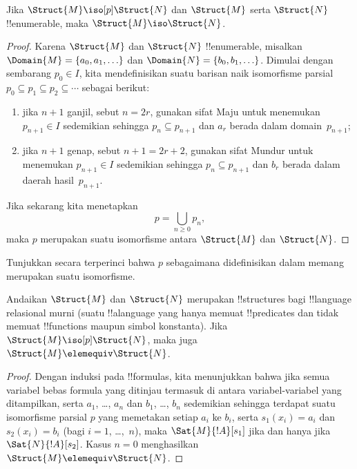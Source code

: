 \documentclass[../../../include/open-logic-section]{subfiles}
\begin{document}
\begin{thm}
  Jika $\Struct{M} \iso[p] \Struct{N}$ dan $\Struct{M}$ serta
  $\Struct{N}$ !!{enumerable}, maka $\Struct{M} \iso \Struct{N}$.
\end{thm}

\begin{proof}
  Karena $\Struct{M}$ dan $\Struct{N}$ !!{enumerable}, misalkan
  $\Domain{M} = \{a_0, a_1, \ldots \}$ dan $\Domain{N} =
  \{b_0, b_1, \ldots \}$. Dimulai dengan sembarang $p_0 \in I$, kita
  mendefinisikan suatu barisan naik isomorfisme parsial $p_0 \subseteq p_1
  \subseteq p_2 \subseteq \cdots$ sebagai berikut:
  \begin{enumerate}
  \item jika $n+1$ ganjil, sebut $n = 2r$, gunakan sifat Maju untuk
    menemukan $p_{n+1} \in I$ sedemikian sehingga $p_n \subseteq p_{n+1}$
    dan $a_r$ berada dalam domain~$p_{n+1}$;
  \item jika $n+1$ genap, sebut $n+1 =2r+2$, gunakan sifat Mundur untuk
    menemukan $p_{n+1} \in I$ sedemikian sehingga $p_n \subseteq p_{n+1}$
    dan $b_r$ berada dalam daerah hasil~$p_{n+1}$.
  \end{enumerate}
Jika sekarang kita menetapkan
\[
p = \bigcup_{n\ge 0} p_n,
\]
maka $p$ merupakan suatu isomorfisme antara $\Struct{M}$ dan $\Struct{N}$.
\end{proof}

\begin{prob}
  Tunjukkan secara terperinci bahwa $p$ sebagaimana didefinisikan dalam
   memang merupakan suatu isomorfisme.
\end{prob}

\begin{thm}
  Andaikan $\Struct{M}$ dan $\Struct{N}$ merupakan !!{structure}s bagi
  !!{language} relasional murni (suatu !!a{language} yang hanya memuat
  !!{predicate}s dan tidak memuat !!{function}s maupun simbol konstanta).
  Jika $\Struct{M} \iso[p] \Struct{N}$, maka juga
  $\Struct{M} \elemequiv \Struct{N}$.
\end{thm}

\begin{proof}
  Dengan induksi pada !!{formula}s, kita menunjukkan bahwa jika semua variabel
  bebas formula yang ditinjau termasuk di antara variabel-variabel yang
  ditampilkan, serta $a_1$,
  \dots, $a_n$ dan $b_1$, \dots, $b_n$ sedemikian sehingga terdapat suatu
  isomorfisme parsial $p$ yang memetakan setiap $a_i$ ke $b_i$, serta
  $s_1(x_i) =a_i$ dan $s_2(x_i) =b_i$ (bagi $i =1$, \dots,~$n$), maka
  $\Sat{M}{!A}[s_1]$ jika dan hanya jika $\Sat{N}{!A}[s_2]$. Kasus
  $n=0$ menghasilkan $\Struct{M} \elemequiv \Struct{N}$.
\end{proof}
\end{document}
